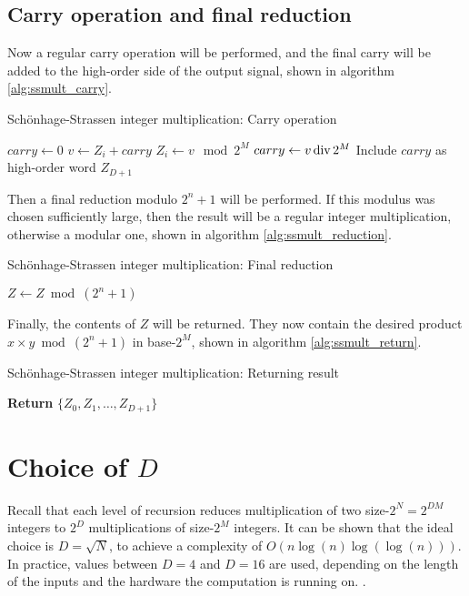 \subsection{Carry operation and final reduction}

Now a regular carry operation will be performed, and the final carry will be
added to the high-order side of the output signal, shown in algorithm
\ref{alg:ssmult_carry}.

\begin{algorithm}
		\caption{Schönhage-Strassen integer multiplication: Carry operation}
		\begin{algorithmic}[1]
				\State $carry \gets 0$
				\State $v \gets Z_i + carry$
				\State $Z_i \gets v \mod 2^M$
				\State $carry \gets v \operatorname{div} 2^M$
				\EndFor
				\State Include $carry$ as high-order word $Z_{D+1}$
				\EndIf
		\end{algorithmic}
		\label{alg:ssmult_carry}
\end{algorithm}

Then a final reduction modulo $2^{n} + 1$ will be performed. If this modulus
was chosen sufficiently large, then the result will be a regular integer
multiplication, otherwise a modular one, shown in algorithm
\ref{alg:ssmult_reduction}.

\begin{algorithm}
		\caption{Schönhage-Strassen integer multiplication: Final reduction}
		\begin{algorithmic}[1]
				\State $Z \gets Z \bmod (2^n + 1)$
		\end{algorithmic}
		\label{alg:ssmult_reduction}
\end{algorithm}

Finally, the contents of $Z$ will be returned. They now contain the desired
product $x \times y \bmod (2^n + 1)$ in base-$2^M$, shown in algorithm
\ref{alg:ssmult_return}.

\begin{algorithm}
		\caption{Schönhage-Strassen integer multiplication: Returning result}
		\begin{algorithmic}[1]
				\State \textbf{Return} $\{Z_0, Z_1, \ldots, Z_{D+1}\}$
				\EndFunction
		\end{algorithmic}
		\label{alg:ssmult_return}
\end{algorithm}

\section{Choice of $D$}

Recall that each level of recursion reduces multiplication of two size-$2^N =
2^{DM}$ integers to $2^D$ multiplications of size-$2^M$ integers. It can be
shown that the ideal choice is $D = \sqrt{N}$, to achieve a complexity of $O(n
\log(n) \log(\log(n)))$\autocite{schonhageSchnelleMultiplikationGrosser1971}.
In practice, values between $D = 4$ and $D = 16$ are used, depending on the
length of the inputs and the hardware the computation is running on.
\autocite{gaudryGmpbasedImplementationSchonhagestrassen2007}.
